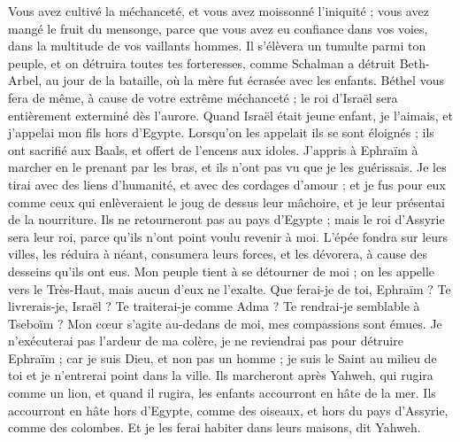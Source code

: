 \begin{multicols}{2}
Vous avez cultivé la méchanceté, et vous avez moissonné l'iniquité ; vous avez mangé le fruit du mensonge, parce que vous avez eu confiance dans vos voies, dans la multitude de vos vaillants hommes.
Il s'élèvera un tumulte parmi ton peuple, et on détruira toutes tes forteresses, comme Schalman a détruit Beth-Arbel, au jour de la bataille, où la mère fut écrasée avec les enfants.
Béthel vous fera de même, à cause de votre extrême méchanceté ; le roi d'Israël sera entièrement exterminé dès l'aurore.
\VerseOne{}Quand Israël était jeune enfant, je l'aimais, et j'appelai mon fils hors d'Egypte.
Lorsqu'on les appelait ils se sont éloignés ; ils ont sacrifié aux Baals, et offert de l'encens aux idoles.
J'appris à Ephraïm à marcher en le prenant par les bras, et ils n'ont pas vu que je les guérissais.
Je les tirai avec des liens d'humanité, et avec des cordages d'amour ; et je fus pour eux comme ceux qui enlèveraient le joug de dessus leur mâchoire, et je leur présentai de la nourriture.
Ils ne retourneront pas au pays d'Egypte ; mais le roi d'Assyrie sera leur roi, parce qu'ils n'ont point voulu revenir à moi.
L'épée fondra sur leurs villes, les réduira à néant, consumera leurs forces, et les dévorera, à cause des desseins qu'ils ont eus.
Mon peuple tient à se détourner de moi ; on les appelle vers le Très-Haut, mais aucun d'eux ne l'exalte.
Que ferai-je de toi, Ephraïm ? Te livrerais-je, Israël ? Te traiterai-je comme Adma ? Te rendrai-je semblable à Tseboïm ? Mon cœur s'agite au-dedans de moi, mes compassions sont émues.
Je n'exécuterai pas l'ardeur de ma colère, je ne reviendrai pas pour détruire Ephraïm ; car je suis Dieu, et non pas un homme ; je suis le Saint au milieu de toi et je n'entrerai point dans la ville.
Ils marcheront après Yahweh, qui rugira comme un lion, et quand il rugira, les enfants accourront en hâte de la mer.
Ils accourront en hâte hors d'Egypte, comme des oiseaux, et hors du pays d'Assyrie, comme des colombes. Et je les ferai habiter dans leurs maisons, dit Yahweh.

\end{multicols}
